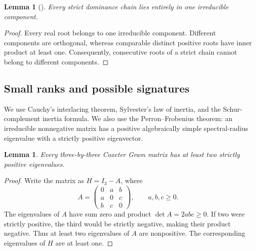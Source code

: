 \documentclass[11pt,reqno]{amsart}
\theoremstyle{plain}
\newtheorem{lemma}[theorem]{Lemma}
\theoremstyle{definition}
\theoremstyle{remark}
\numberwithin{equation}{section}
\begin{document}
\begin{lemma}[{\cite[Proposition 4.6]{FuEtAl2026}}]\label{lem:components}
Every strict dominance chain lies entirely in one irreducible component.
\end{lemma}
\begin{proof}
Every real root belongs to one irreducible component. Different components are orthogonal, whereas comparable distinct positive roots have inner product at least one. Consequently, consecutive roots of a strict chain cannot belong to different components.
\end{proof}

\subsection{Small ranks and possible signatures}

We use Cauchy's interlacing theorem, Sylvester's law of inertia, and the Schur-complement inertia formula. We also use the Perron--Frobenius theorem: an irreducible nonnegative matrix has a positive algebraically simple spectral-radius eigenvalue with a strictly positive eigenvector.

\begin{lemma}\label{lem:three-positive}
Every three-by-three Coxeter Gram matrix has at least two strictly positive eigenvalues.
\end{lemma}
\begin{proof}
Write the matrix as $H=I_3-A$, where
\[
A=\begin{pmatrix}0&a&b\\a&0&c\\b&c&0\end{pmatrix},\qquad a,b,c\geq0.
\]
The eigenvalues of $A$ have sum zero and product $\det A=2abc\geq0$. If two were strictly positive, the third would be strictly negative, making their product negative. Thus at least two eigenvalues of $A$ are nonpositive. The corresponding eigenvalues of $H$ are at least one.
\end{proof}
\end{document}
